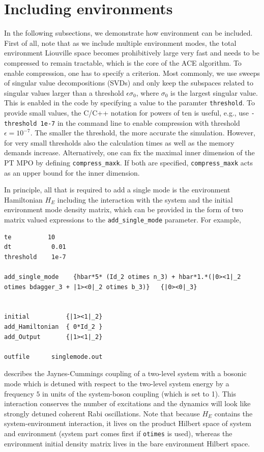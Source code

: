 \documentclass{scrartcl}
\begin{document}
\section{Including environments}
In the following subsections, we demonstrate how environment can be included.
First of all, note that as we include multiple environment modes, the 
total environment Liouville space becomes prohibitively large 
very fast and needs to be compressed to remain tractable, 
which is the core of the ACE algorithm.
To enable compression, one has to specify a criterion. Most commonly, we
use sweeps of singular value decompositions (SVDs) and only keep the subspaces
related to singular values larger than a threshold $\epsilon \sigma_0$, where
$\sigma_0$ is the largest singular value. This is enabled in the code by
specifying a value to the paramter \texttt{threshold}. To provide small values,
the C/C++ notation for powers of ten is useful, e.g., use 
\verb+-threshold 1e-7+ in the command line to enable compression with threshold
$\epsilon =10^{-7}$. 
The smaller the
threshold, the more accurate the simulation. 
However, for very small thresholds also the calculation times as well as
the memory demands increase.
Alternatively, one can fix the maximal inner dimension of
the PT MPO by defining \verb+compress_maxk+. If both are specified, 
\verb+compress_maxk+ acts as an upper bound for the inner dimension.

In principle, all that is required to add a single mode is the environment
Hamiltonian $H_E$ including the interaction with the system and the initial
environment mode density matrix, which can be provided in the form 
of two matrix valued expressions to the \verb+add_single_mode+ parameter.
For example, 

\noindent\makebox[5cm]{\rule{7cm}{0.4pt}}
\begin{verbatim}
te          10
dt           0.01
threshold    1e-7

add_single_mode    {hbar*5* (Id_2 otimes n_3) + hbar*1.*(|0><1|_2 otimes bdagger_3 + |1><0|_2 otimes b_3)}   {|0><0|_3}


initial          {|1><1|_2}
add_Hamiltonian  { 0*Id_2 }
add_Output       {|1><1|_2}

outfile      singlemode.out 
\end{verbatim}
\noindent\makebox[5cm]{\rule{7cm}{0.4pt}}

describes the Jaynes-Cummings coupling of a two-level system with a 
bosonic mode which is detuned with respect to the two-level system energy
by a frequency $5$ in units of the system-boson coupling (which is set to 1).  
This interaction conserves the number of excitations and the dynamics will 
look like strongly detuned coherent Rabi oscillations.
Note that because $H_E$ contains the system-environment interaction, it
lives on the product Hilbert space of system and environment (system part comes
first if \verb+otimes+ is used), whereas the environment initial density
matrix lives in the bare environment Hilbert space.
\end{document}
